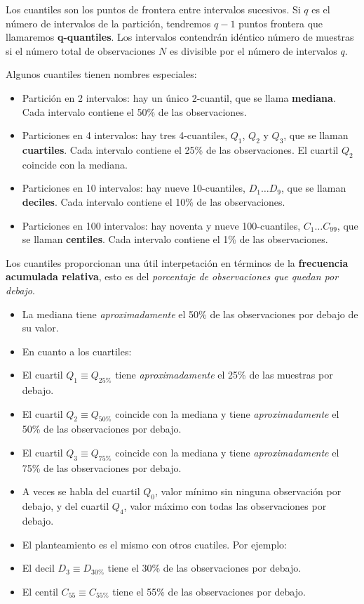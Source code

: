 \documentclass[11pt]{article}
\providecommand{\tightlist}{%
      \setlength{\itemsep}{0pt}\setlength{\parskip}{0pt}}
\begin{document}
Los cuantiles son los puntos de frontera entre intervalos sucesivos. Si
\(q\) es el número de intervalos de la partición, tendremos \(q-1\)
puntos frontera que llamaremos \textbf{q-quantiles}. Los intervalos
contendrán idéntico número de muestras si el número total de
observaciones \(N\) es divisible por el número de intervalos \(q\).

    Algunos cuantiles tienen nombres especiales:

\begin{itemize}
\tightlist
\item
  Partición en 2 intervalos: hay un único 2-cuantil, que se llama
  \textbf{mediana}. Cada intervalo contiene el 50\% de las
  observaciones.
\item
  Particiones en 4 intervalos: hay tres 4-cuantiles, \(Q_1\), \(Q_2\) y
  \(Q_3\), que se llaman \textbf{cuartiles}. Cada intervalo contiene el
  25\% de las observaciones. El cuartil \(Q_2\) coincide con la mediana.
\item
  Particiones en 10 intervalos: hay nueve 10-cuantiles,
  \(D_1 \ldots D_9\), que se llaman \textbf{deciles}. Cada intervalo
  contiene el 10\% de las observaciones.
\item
  Particiones en 100 intervalos: hay noventa y nueve 100-cuantiles,
  \(C_1 \ldots C_{99}\), que se llaman \textbf{centiles}. Cada intervalo
  contiene el 1\% de las observaciones.
\end{itemize}

    Los cuantiles proporcionan una útil interpetación en términos de la
\textbf{frecuencia acumulada relativa}, esto es del \emph{porcentaje de
observaciones que quedan por debajo}.

\begin{itemize}
\tightlist
\item
  La mediana tiene \emph{aproximadamente} el 50\% de las observaciones
  por debajo de su valor.
\item
  En cuanto a los cuartiles:
\item
  El cuartil \(Q_1 \equiv Q_{25\%}\) tiene \emph{aproximadamente} el
  25\% de las muestras por debajo.
\item
  El cuartil \(Q_2 \equiv Q_{50\%}\) coincide con la mediana y tiene
  \emph{aproximadamente} el 50\% de las observaciones por debajo.
\item
  El cuartil \(Q_3 \equiv Q_{75\%}\) coincide con la mediana y tiene
  \emph{aproximadamente} el 75\% de las observaciones por debajo.
\item
  A veces se habla del cuartil \(Q_0\), valor mínimo sin ninguna
  observación por debajo, y del cuartil \(Q_4\), valor máximo con todas
  las observaciones por debajo.
\item
  El planteamiento es el mismo con otros cuatiles. Por ejemplo:
\item
  El decil \(D_3 \equiv D_{30\%}\) tiene el 30\% de las observaciones
  por debajo.
\item
  El centil \(C_{55} \equiv C_{55\%}\) tiene el 55\% de las
  observaciones por debajo.
\end{itemize}
\end{document}
